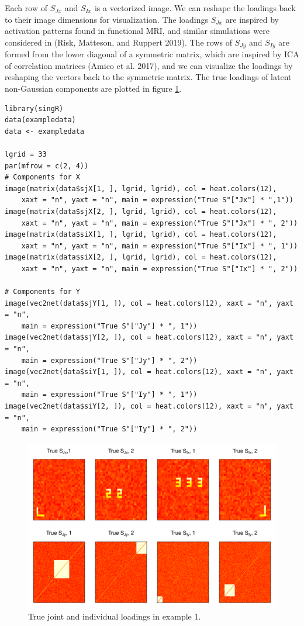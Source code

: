 Each row of \(S_{Jx}\) and \(S_{Ix}\) is a vectorized image. We can reshape the loadings back to their image dimensions for visualization. The loadings \(S_{Jx}\) are inspired by activation patterns found in functional MRI, and similar simulations were considered in (Risk, Matteson, and Ruppert 2019). The rows of \(S_{Jy}\) and \(S_{Iy}\) are formed from the lower diagonal of a symmetric matrix, which are inspired by ICA of correlation matrices (Amico et al. 2017), and we can visualize the loadings by reshaping the vectors back to the symmetric matrix. The true loadings of latent non-Gaussian components are plotted in figure \ref{fig:origin}.

\begin{verbatim}
library(singR)
data(exampledata)
data <- exampledata

lgrid = 33
par(mfrow = c(2, 4))
# Components for X
image(matrix(data$sjX[1, ], lgrid, lgrid), col = heat.colors(12),
    xaxt = "n", yaxt = "n", main = expression("True S"["Jx"] * ",1"))
image(matrix(data$sjX[2, ], lgrid, lgrid), col = heat.colors(12),
    xaxt = "n", yaxt = "n", main = expression("True S"["Jx"] * ", 2"))
image(matrix(data$siX[1, ], lgrid, lgrid), col = heat.colors(12),
    xaxt = "n", yaxt = "n", main = expression("True S"["Ix"] * ", 1"))
image(matrix(data$siX[2, ], lgrid, lgrid), col = heat.colors(12),
    xaxt = "n", yaxt = "n", main = expression("True S"["Ix"] * ", 2"))

# Components for Y
image(vec2net(data$sjY[1, ]), col = heat.colors(12), xaxt = "n", yaxt = "n",
    main = expression("True S"["Jy"] * ", 1"))
image(vec2net(data$sjY[2, ]), col = heat.colors(12), xaxt = "n", yaxt = "n",
    main = expression("True S"["Jy"] * ", 2"))
image(vec2net(data$siY[1, ]), col = heat.colors(12), xaxt = "n", yaxt = "n",
    main = expression("True S"["Iy"] * ", 1"))
image(vec2net(data$siY[2, ]), col = heat.colors(12), xaxt = "n", yaxt = "n",
    main = expression("True S"["Iy"] * ", 2"))
\end{verbatim}

\begin{figure}
\includegraphics[width=1\linewidth]{figures/Original_data_figure} \caption{True joint and individual loadings in example 1.}\label{fig:origin}
\end{figure}

